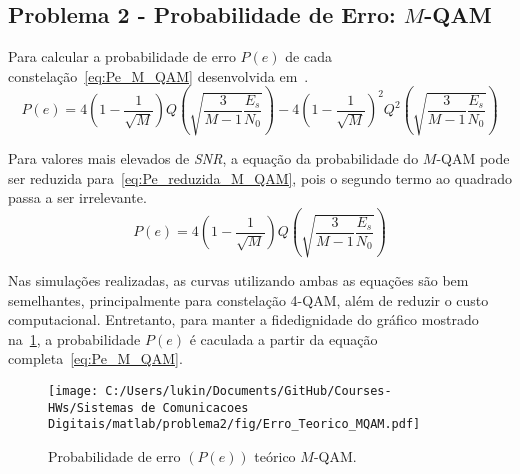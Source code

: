 \subsection{Problema 2 - Probabilidade de Erro: \texorpdfstring{$M$}{M}-QAM}
Para calcular a probabilidade de erro $P(e)$ de cada constelação~\ref{eq:Pe_M_QAM} desenvolvida em~\cite{Cecilio}.
\begin{equation}
    P(e) = 4 \left(1-\frac{1}{\sqrt{M}}\right) Q\left(\sqrt{\frac{3}{M-1}\frac{E_s}{N_0}}\right) - 4\left(1-\frac{1}{\sqrt{M}}\right)^2 Q^2\left(\sqrt{\frac{3}{M-1}\frac{E_s}{N_0}}\right)
    \label{eq:Pe_M_QAM}
\end{equation}

Para valores mais elevados de \textit{SNR}, a equação da probabilidade do $M$-QAM pode ser reduzida para~\ref{eq:Pe_reduzida_M_QAM}, pois o segundo termo ao quadrado passa a ser irrelevante.
\begin{equation}
    P(e) = 4 \left(1-\frac{1}{\sqrt{M}}\right) Q\left(\sqrt{\frac{3}{M-1}\frac{E_s}{N_0}}\right)
    \label{eq:Pe_reduzida_M_QAM}
\end{equation}

Nas simulações realizadas, as curvas utilizando ambas as equações são bem semelhantes, principalmente para constelação 4-QAM, além de reduzir o custo computacional. Entretanto, para manter a fidedignidade do gráfico mostrado na~\ref{fig:Erro_Teorico_MQAM}, a probabilidade $P(e)$ é caculada a partir da equação completa~\ref{eq:Pe_M_QAM}.

\begin{figure}[!ht]
    \centering
    \texttt{[image: C:/Users/lukin/Documents/GitHub/Courses-HWs/Sistemas de Comunicacoes Digitais/matlab/problema2/fig/Erro\_Teorico\_MQAM.pdf]}
    \caption{Probabilidade de erro $(P(e))$ teórico $M$-QAM.}
    \label{fig:Erro_Teorico_MQAM}
\end{figure}